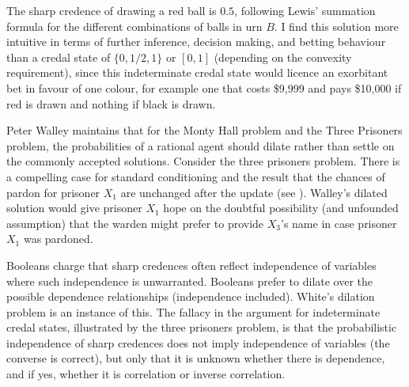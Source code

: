 The sharp credence of drawing a red ball is $0.5$,
following Lewis' summation formula for the different
combinations of balls in urn $B$. I find this solution
more intuitive in terms of further inference, decision
making, and betting behaviour than a credal state of
$\{0,1/2,1\}$ or $[0,1]$ (depending on the convexity
requirement), since this indeterminate credal state
would licence an exorbitant bet in favour of one
colour, for example one that costs \$9,999 and pays
\$10,000 if red is drawn and nothing if black is drawn.


Peter Walley maintains that for the Monty Hall problem
and the Three Prisoners problem, the probabilities of a
rational agent should dilate rather than settle on the
commonly accepted solutions. Consider the three
prisoners problem. There is a compelling case for
standard conditioning and the result that the chances
of pardon for prisoner $X_{1}$ are unchanged after the
update (see ). Walley's
dilated solution would give prisoner $X_{1}$ hope on
the doubtful possibility (and unfounded assumption)
that the warden might prefer to provide $X_{3}$'s name
in case prisoner $X_{1}$ was pardoned.

Booleans charge that sharp credences often reflect
independence of variables where such independence is
unwarranted. Booleans prefer to dilate over the
possible dependence relationships (independence
included). White's dilation problem is an instance of
this. The fallacy in the argument for indeterminate
credal states, illustrated by the three prisoners
problem, is that the probabilistic independence of
sharp credences does not imply independence of
variables (the converse is correct), but only that it
is unknown whether there is dependence, and if yes,
whether it is correlation or inverse correlation.


